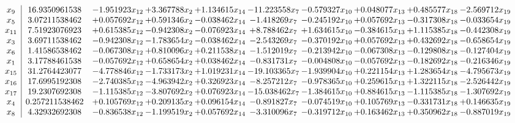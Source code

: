 \documentclass[10pt]{article}
\begin{document}
 \[\begin{array}{c| c c@{\hskip 2pt} c@{\hskip 2pt} c@{\hskip 2pt} c@{\hskip 2pt} c@{\hskip 2pt} c@{\hskip 2pt} c@{\hskip 2pt} c@{\hskip 2pt} }
 x_{9}   &  16.9350961538 & -1.951923 x_{12} & + 3.367788 x_{2} & + 1.134615 x_{14} & -11.223558 x_{7} & -0.579327 x_{10} & + 0.048077 x_{13} & + 0.485577 x_{18} & -2.569712 x_{19}\\
 x_{5}   &  3.07211538462 & + 0.057692 x_{12} & + 0.591346 x_{2} & -0.038462 x_{14} & -1.418269 x_{7} & -0.245192 x_{10} & + 0.057692 x_{13} & -0.317308 x_{18} & -0.033654 x_{19}\\
 x_{11}   &  7.51923076923 & + 0.615385 x_{12} & -0.942308 x_{2} & -0.076923 x_{14} & + 8.788462 x_{7} & + 1.634615 x_{10} & -0.384615 x_{13} & + 1.115385 x_{18} & -0.442308 x_{19}\\
 x_{3}   &  3.69711538462 & -0.942308 x_{12} & -1.783654 x_{2} & -0.038462 x_{14} & -2.543269 x_{7} & -0.370192 x_{10} & + 0.057692 x_{13} & + 0.432692 x_{18} & -0.658654 x_{19}\\
 x_{6}   &  1.41586538462 & -0.067308 x_{12} & + 0.810096 x_{2} & + 0.211538 x_{14} & -1.512019 x_{7} & -0.213942 x_{10} & -0.067308 x_{13} & -0.129808 x_{18} & -0.127404 x_{19}\\
 x_{1}   &  3.17788461538 & -0.057692 x_{12} & + 0.658654 x_{2} & + 0.038462 x_{14} & -0.831731 x_{7} & -0.004808 x_{10} & -0.057692 x_{13} & -0.182692 x_{18} & -0.216346 x_{19}\\
 x_{15}   &  31.2764423077 & -4.778846 x_{12} & -1.733173 x_{2} & + 1.019231 x_{14} & -19.103365 x_{7} & -1.939904 x_{10} & + 0.221154 x_{13} & + 1.283654 x_{18} & -4.795673 x_{19}\\
 x_{16}   &  17.6995192308 & -2.740385 x_{12} & -4.963942 x_{2} & + 0.326923 x_{14} & -8.257212 x_{7} & -0.978365 x_{10} & + 0.259615 x_{13} & + 1.322115 x_{18} & -2.526442 x_{19}\\
 x_{17}   &  19.2307692308 & -1.115385 x_{12} & -3.807692 x_{2} & + 0.076923 x_{14} & -15.038462 x_{7} & -1.384615 x_{10} & + 0.884615 x_{13} & -1.115385 x_{18} & -1.307692 x_{19}\\
 x_{4}   &  0.257211538462 & + 0.105769 x_{12} & + 0.209135 x_{2} & + 0.096154 x_{14} & -0.891827 x_{7} & -0.074519 x_{10} & + 0.105769 x_{13} & -0.331731 x_{18} & + 0.146635 x_{19}\\
 x_{8}   &  4.32932692308 & -0.836538 x_{12} & -1.199519 x_{2} & + 0.057692 x_{14} & -3.310096 x_{7} & -0.319712 x_{10} & + 0.163462 x_{13} & + 0.350962 x_{18} & -0.887019 x_{19}\\

\end{array}\]
\end{document}
